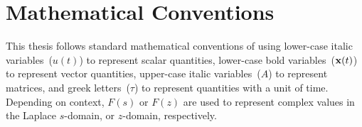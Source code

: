 \cleardoublepage
{}
\renewcommand\contentsname{Table of Contents}
\tableofcontents
\cleardoublepage
{}

\listoftodos
\cleardoublepage
{}

\listoftables
\cleardoublepage
{}

\listoffigures
\cleardoublepage
{}

\chapter*{Mathematical Conventions}
\label{typography}

This thesis follows standard mathematical conventions of using lower-case italic variables~($u(t)$) to represent scalar quantities, lower-case bold variables~($\mathbf{x}(t)$) to represent vector quantities, upper-case italic variables~($A$) to represent matrices, and greek letters~($\tau$) to represent quantities with a unit of time.
Depending on context, $F(s)$ or $F(z)$ are used to represent complex values in the Laplace $s$-domain, or $z$-domain, respectively.

\cleardoublepage
{}

